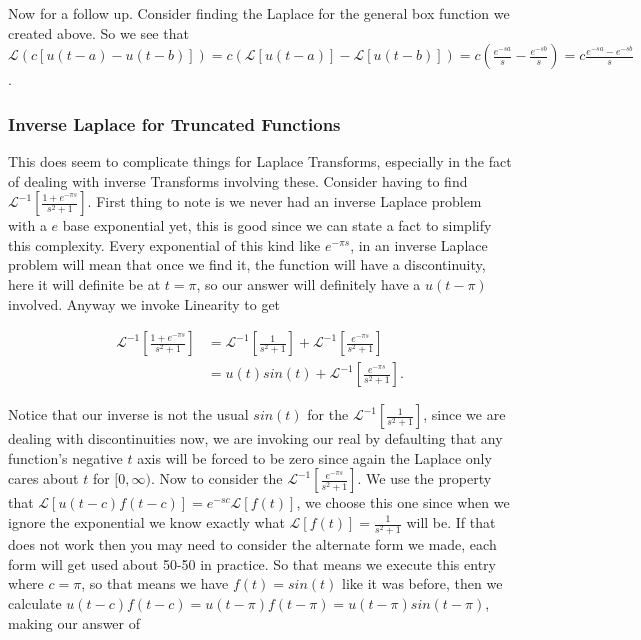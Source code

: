 \documentclass[12pt]{article}
\newcommand{\lp}{\mathscr{L}}
\begin{document}
Now for a follow up. Consider finding the Laplace for the general box function we created above. So we see that $\lp(c[u(t-a)-u(t-b)])=c(\lp[u(t-a)]-\lp[u(t-b)])=c\left( \frac{e^{-sa}}{s}-\frac{e^{-sb}}{s}\right)=c\frac{e^{-sa}-e^{-sb}}{s}$. \\

\subsubsection{Inverse Laplace for Truncated Functions}

This does seem to complicate things for Laplace Transforms, especially in the fact of dealing with inverse Transforms involving these. Consider having to find $\lp^{-1}\left[\frac{1+e^{-\pi s}}{s^2+1}\right]$. First thing to note is we never had an inverse Laplace problem with a $e$ base exponential yet, this is good since we can state a fact to simplify this complexity. Every exponential of this kind like $e^{-\pi s}$, in an inverse Laplace problem will mean that once we find it, the function will have a discontinuity, here it will definite be at $t=\pi$, so our answer will definitely have a $u(t-\pi)$ involved. Anyway we invoke Linearity to get

\begin{align*}
    \lp^{-1}\left[\frac{1+e^{-\pi s}}{s^2+1}\right] &= \lp^{-1}\left[\frac{1}{s^2+1}\right] + \lp^{-1}\left[\frac{e^{-\pi s}}{s^2+1}\right] \\
    &= u(t)sin(t) + \lp^{-1}\left[\frac{e^{-\pi s}}{s^2+1}\right].
\end{align*}

Notice that our inverse is not the usual $sin(t)$ for the $\lp^{-1}\left[\frac{1}{s^2+1}\right]$, since we are dealing with discontinuities now, we are invoking our real by defaulting that any function's negative $t$ axis will be forced to be zero since again the Laplace only cares about $t$ for $[0,\infty)$. Now to consider the $\lp^{-1}\left[\frac{e^{-\pi s}}{s^2+1}\right]$. We use the property that $\lp[u(t-c)f(t-c)]=e^{-sc}\lp[f(t)]$, we choose this one since when we ignore the exponential we know exactly what $\lp[f(t)]=\frac{1}{s^2+1}$ will be. If that does not work then you may need to consider the alternate form we made, each form will get used about 50-50 in practice. So that means we execute this entry where $c=\pi$, so that means we have $f(t)=sin(t)$ like it was before, then we calculate $u(t-c)f(t-c)=u(t-\pi)f(t-\pi)=u(t-\pi)sin(t-\pi)$, making our answer of
\end{document}
